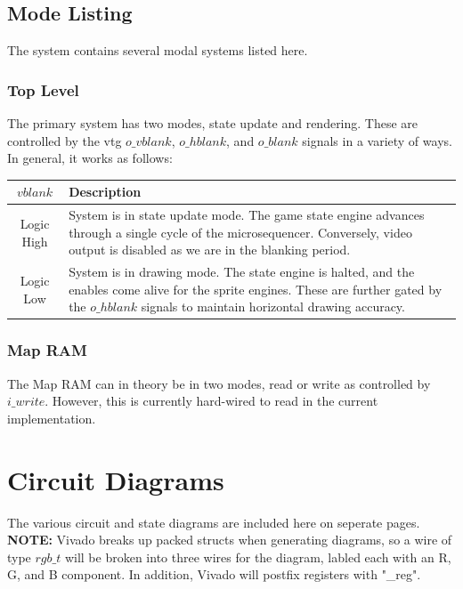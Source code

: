 \documentclass[12pt]{article}
\begin{document}
%
%
\subsection{Mode Listing}
The system contains several modal systems listed here.

\subsubsection*{Top Level}
The primary system has two modes, state update and rendering. These are
controlled by the vtg $o\_vblank$, $o\_hblank$, and $o\_blank$ signals in a variety
of ways. In general, it works as follows:

\begingroup
{}
\label{tab:top_level_video_mode}
\begin{tabularx}{\linewidth}{ ||c|X|| }
    \hline
    $vblank$ & Description \\
    \hline
    Logic High & System is in state update mode. The game state engine advances through a
    single cycle of the microsequencer. Conversely, video output is disabled as
    we are in the blanking period. \\
    Logic Low & System is in drawing mode. The state engine is halted, and the
    enables come alive for the sprite engines. These are further gated by the
    $o\_hblank$ signals to maintain horizontal drawing accuracy. \\
    \hline
\end{tabularx}
\endgroup

\subsubsection*{Map RAM}
The Map RAM can in theory be in two modes, read or write as controlled by
$i\_write$. However, this is currently hard-wired to read in the current implementation.

\newpage
\section{Circuit Diagrams}
The various circuit and state diagrams are included here on seperate pages. \\
\textbf{NOTE:} Vivado breaks up packed structs when generating diagrams, so a
wire of type $rgb\_t$ will be broken into three wires for the diagram, labled
each with an R, G, and B component. In addition, Vivado will postfix registers
with "\_reg".
\end{document}
